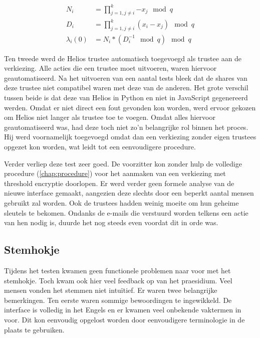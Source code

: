 \begin{align}
  \label{eq:kv:modular_lagrange_numerator} 
  N_i & = \prod_{j=1, j\not=i}^k{-x_j} \mod{q} \\
  \label{eq:kv:modular_lagrange_denominator}
  D_i & = \prod_{j=1, j\not=i}^k{(x_i - x_j)} \mod{q} \\
  \label{eq:kv:modular_lagrange_result}
  \lambda{_i}(0) & = N_i * (D_i^{-1} \mod{q}) \mod{q}
\end{align}

\npar Ten tweede werd de Helios trustee automatisch toegevoegd als trustee aan de verkiezing. Alle acties die een trustee moet uitvoeren, waren hiervoor geautomatiseerd. Na het uitvoeren van een aantal tests bleek dat de shares van deze trustee niet compatibel waren met deze van de anderen. Het grote verschil tussen beide is dat deze van Helios in Python en niet in JavaScript gegenereerd werden. Omdat er niet direct een fout gevonden kon worden, werd ervoor gekozen om Helios niet langer als trustee toe te voegen. Omdat alles hiervoor geautomatiseerd was, had deze toch niet zo'n belangrijke rol binnen het proces. Hij werd voornamelijk toegevoegd omdat dan een verkiezing zonder eigen trustees opgezet kon worden, wat leidt tot een eenvoudigere procedure.

\npar Verder verliep deze test zeer goed. De voorzitter kon zonder hulp de volledige procedure (\ref{chap:procedure}) voor het aanmaken van een verkiezing met threshold encryptie doorlopen. Er werd verder geen formele analyse van de nieuwe interface gemaakt, aangezien deze slechts door een beperkt aantal mensen gebruikt zal worden. Ook de trustees hadden weinig moeite om hun geheime sleutels te bekomen. Ondanks de e-mails die verstuurd worden telkens een actie van hen nodig is, duurde het nog steeds even voordat dit in orde was.

\subsection{Stemhokje}
\label{sec:kv:stemhokje}

Tijdens het testen kwamen geen functionele problemen naar voor met het stemhokje. Toch kwam ook hier veel feedback op van het praesidium. Veel mensen vonden het stemmen niet intu\"itief. Er waren twee belangrijke bemerkingen. Ten eerste waren sommige bewoordingen te ingewikkeld. De interface is volledig in het Engels en er kwamen veel onbekende vaktermen in voor. Dit kon eenvoudig opgelost worden door eenvoudigere terminologie in de plaats te gebruiken.


